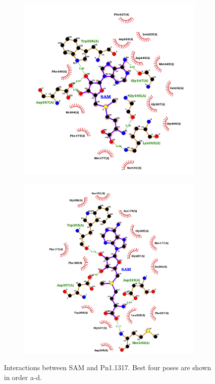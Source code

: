 \documentclass[12pt]{article}
\begin{document}
\begin{figure}[h!]
\begin{subfigure}[h!]{0.35\textwidth}
			\caption{}
		\end{subfigure}
		\hfill
		\begin{subfigure}[h!]{0.35\textwidth}
			\hspace{2cm}
			\includegraphics[width=\textwidth]{../4/Dock/best3.png}
			\caption{}
		\end{subfigure}
		\hfill
		\begin{subfigure}[h!]{0.35\textwidth}
			\hspace{-2cm}
			\includegraphics[width=\textwidth]{../4/Dock/best4.png}
			\caption{}
		\end{subfigure}
		\hfill
		\caption[Interactions between SAM and Pn1.1317.]{\centering Interactions between SAM and Pn1.1317. Best four poses are shown in order a-d.}
		\label{fig4_7}
	\end{figure}
	\FloatBarrier
	
\end{document}
